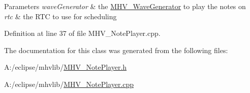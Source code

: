 \begin{DoxyParams}{Parameters}
{\em wave\-Generator} & the \hyperlink{class_m_h_v___wave_generator}{M\-H\-V\-\_\-\-Wave\-Generator} to play the notes on \\
\hline
{\em rtc} & the R\-T\-C to use for scheduling \\
\hline
\end{DoxyParams}


Definition at line 37 of file M\-H\-V\-\_\-\-Note\-Player.\-cpp.



The documentation for this class was generated from the following files\-:\begin{DoxyCompactItemize}
\item 
A\-:/eclipse/mhvlib/\hyperlink{_m_h_v___note_player_8h}{M\-H\-V\-\_\-\-Note\-Player.\-h}\item 
A\-:/eclipse/mhvlib/\hyperlink{_m_h_v___note_player_8cpp}{M\-H\-V\-\_\-\-Note\-Player.\-cpp}\end{DoxyCompactItemize}
